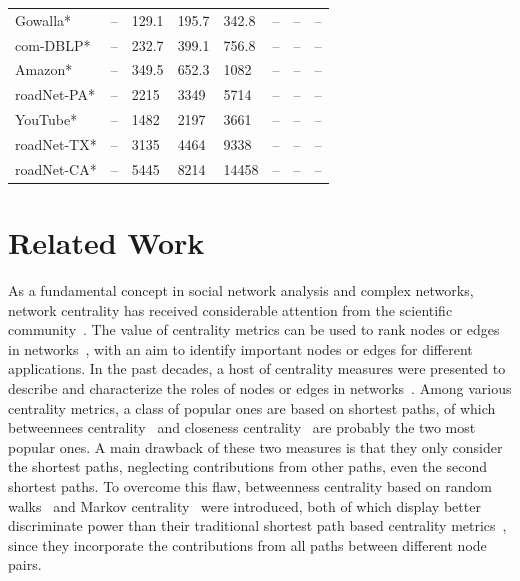 \documentclass[10pt,twocolumn,twoside]{IEEEtran}
\begin{document}
\begin{table}[htbp]
\begin{threeparttable}
\begin{tabularx}{8.75cm}{p{1.75cm}<{\centering} p{0.6cm}<{\centering} p{0.4cm}<{\centering} p{0.4cm}<{\centering} p{0.4cm}<{\centering} p{0.4cm}<{\centering} p{0.4cm}<{\centering} p{0.4cm}<{\centering}}
            Gowalla*                                                           & --    & 129.1   & 195.7    & 342.8   & --    & --    & --    \\
            com-DBLP*                                                          & --    & 232.7   & 399.1    & 756.8   & --    & --    & --    \\
            Amazon*                                                            & --    & 349.5   & 652.3    & 1082    & --    & --    & --    \\
            roadNet-PA*                                                        & --    & 2215    & 3349     & 5714    & --    & --    & --    \\
            YouTube*                                                           & --    & 1482    & 2197     & 3661    & --    & --    & --    \\
            roadNet-TX*                                                        & --    & 3135    & 4464     & 9338    & --    & --    & --    \\
            roadNet-CA*                                                        & --    & 5445    & 8214     & 14458   & --    & --    & --    \\
            \bottomrule
        \end{tabularx}
    \end{threeparttable}
\end{table}

\section{Related Work}

As a fundamental concept in social network analysis and complex networks, network centrality has received considerable attention from the scientific community~\cite{Ne10}. The value of centrality metrics can be used to rank nodes or edges in networks~\cite{LuChReZhZhZh16}, with an aim to identify important nodes or edges for different applications. In the past decades, a host of centrality measures were presented to describe and characterize the roles of nodes or edges in networks~\cite{WhSm03,BoVi14,BeKl15,BoDeRi16,LiZh18,YiShLiZh18,BaXuZh22,BaZh22}. Among various centrality metrics, a class of popular ones are based on shortest paths, of which   betweennees centrality~\cite{Br01,GeSaSc08} and closeness centrality~\cite{Ba48,Ba50} are probably the two most popular ones. A main drawback of these two measures is that they only consider the shortest paths, neglecting contributions from other paths, even the second shortest paths. To overcome this flaw, betweenness centrality based on random walks~\cite{Ne05} and Markov centrality~\cite{WhSm03}  were introduced, both of which display better discriminate power than their traditional shortest path based centrality metrics~\cite{Ne05,BeWeLuMe16}, since they incorporate the contributions from all paths between different node pairs.
\end{document}
